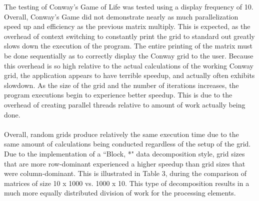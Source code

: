 \documentclass[12pt, letterpaper]{report}
\begin{document}
The testing of Conway's Game of Life was tested using a display frequency of 10. Overall, Conway's Game did not demonstrate nearly as much parallelization speed up and efficiency as the previous matrix multiply. This is expected, as the overhead of context switching to constantly print the grid to standard out greatly slows down the execution of the program. The entire printing of the matrix must be done sequentially as to correctly display the Conway grid to the user. Because this overhead is so high relative to the actual calculations of the working Conway grid, the application appears to have terrible speedup, and actually often exhibits slowdown. As the size of the grid and the number of iterations increases, the program executions begin to experience better speedup. This is due to the overhead of creating parallel threads relative to amount of work actually being done. 
\\ \\
Overall, random grids produce relatively the same execution time due to the same amount of calculations being conducted regardless of the setup of the grid. Due to the implementation of a ``Block, *" data decomposition style, grid sizes that are more row-dominant experienced a higher speedup than grid sizes that were column-dominant. This is illustrated in Table 3, during the comparison of matrices of size 10 x 1000 vs. 1000 x 10. This type of decomposition results in a much more equally distributed division of work for the processing elements.
\end{document}
